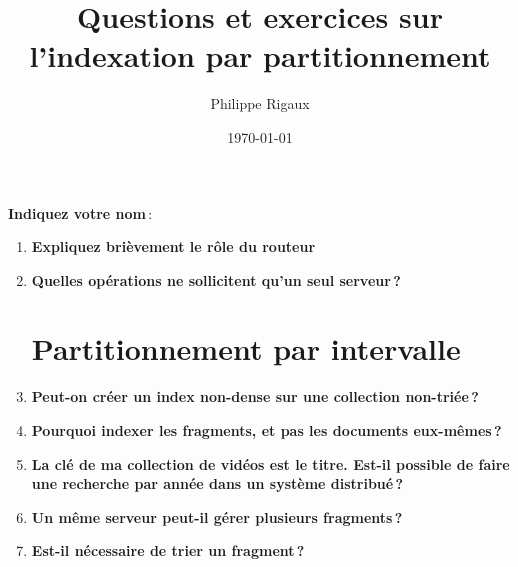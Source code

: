 \documentclass{article}
\title{Questions et exercices sur l'indexation par partitionnement}
\author{Philippe Rigaux}
\date{\today}
\begin{document}
\maketitle

\textbf{Indiquez votre nom}\,:


\begin{enumerate}

 \section{Distribution par partitionnement}

  \item \textbf{Expliquez brièvement le rôle du routeur}
  
  \vspace*{4cm}
  
  \item \textbf{Quelles opérations ne sollicitent qu'un seul serveur\,?}
  
  \vspace*{4cm}
  
\section{Partitionnement par intervalle}
  
  
 \item \textbf{Peut-on créer un index non-dense sur une collection non-triée\,?}
 
   \vspace*{4cm}
  
  
 \item \textbf{Pourquoi indexer les fragments, et pas les documents eux-mêmes\,?}
 
   \vspace*{4cm}
 
 \item \textbf{La clé de ma collection de vidéos est le titre. Est-il possible de faire
      une recherche par année dans un système distribué\,?}
 
   \vspace*{4cm}
    
 \item \textbf{Un même serveur peut-il gérer plusieurs fragments\,?}
   
   \vspace*{4cm}
      
 \item \textbf{Est-il nécessaire de trier un fragment\,?}
   

\end{enumerate}
\end{document}
